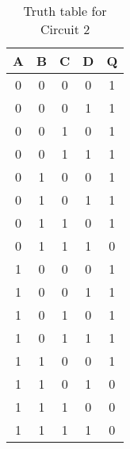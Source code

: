 \documentclass[12pt]{article}
\begin{document}
\begin{table}[H]
	\centering
	\begin{tabular}{|c|c|c|c||c|}
		\hline
		\textbf{A} & \textbf{B} & \textbf{C} & \textbf{D} & \textbf{Q} \\
		\hline \hline
		0 & 0 & 0 & 0 & 1 \\
		\hline
		0 & 0 & 0 & 1 & 1 \\
		\hline
		0 & 0 & 1 & 0 & 1 \\
		\hline
		0 & 0 & 1 & 1 & 1 \\
		\hline
		0 & 1 & 0 & 0 & 1 \\
		\hline
		0 & 1 & 0 & 1 & 1 \\
		\hline
		0 & 1 & 1 & 0 & 1 \\
		\hline
		0 & 1 & 1 & 1 & 0 \\
		\hline
		1 & 0 & 0 & 0 & 1 \\
		\hline
		1 & 0 & 0 & 1 & 1 \\
		\hline
		1 & 0 & 1 & 0 & 1 \\
		\hline
		1 & 0 & 1 & 1 & 1 \\
		\hline
		1 & 1 & 0 & 0 & 1 \\
		\hline
		1 & 1 & 0 & 1 & 0 \\
		\hline
		1 & 1 & 1 & 0 & 0 \\
		\hline
		1 & 1 & 1 & 1 & 0 \\
		\hline
	\end{tabular}
\caption{Truth table for Circuit 2}
\end{table}
\end{document}
